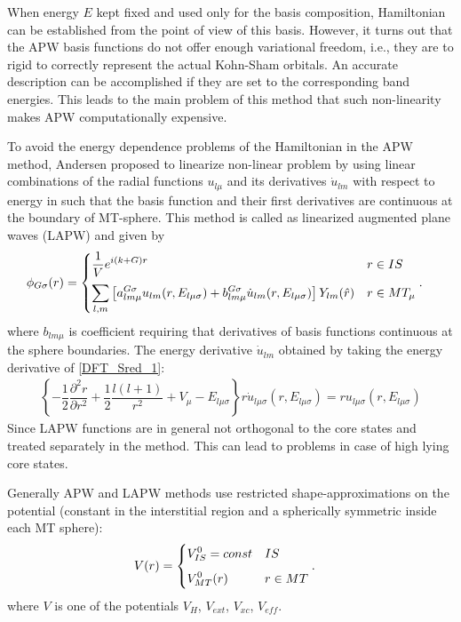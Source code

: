 When energy $E$ kept fixed and used only for the basis composition, Hamiltonian can be established from the point of view of this basis. However, it turns out that the APW basis functions do not offer enough variational freedom, i.e., they are to rigid to correctly represent the actual Kohn-Sham orbitals. An accurate description can be accomplished if they are set to the corresponding band energies. This leads to the main problem of this method that such non-linearity makes APW computationally expensive.

To avoid the energy dependence problems of the Hamiltonian in the APW method, Andersen proposed to linearize non-linear problem by using linear combinations of the radial functions $u_{l \mu}$ and its derivatives $\dot{u}_{l m}$ with respect to energy in such that the basis function and their first derivatives are continuous at the boundary of MT-sphere. This method is called as linearized augmented plane waves (LAPW) \citep{PhysRevB.12.3060} and given by
\begin{align}
\phi_{G \sigma}(r)
 &=
  \begin{cases}
   \vspace{.2cm}
   \displaystyle
   \dfrac{1}{V} e^{i(k+G)r}
   & r \in IS
   \\
   \displaystyle
   \sum_{l,m} \left[ a_{l m \mu}^{G \sigma} u_{l m} (r,E_{l \mu \sigma})+b_{l m \mu}^{G \sigma} \dot{u}_{l m} (r,E_{l \mu \sigma})  \right]  Y_{l m} (\hat{r})
   & r \in MT_{\mu}
  \end{cases}.
\label{LAPW}
\end{align}
where $b_{l m \mu}$ is coefficient requiring that derivatives of basis functions continuous at the sphere boundaries.
The energy derivative $\dot{u}_{l m}$ obtained by taking the energy derivative of \eqref{DFT_Sred_1}:
\begin{align}
\left\lbrace -\dfrac{1}{2} \dfrac{\partial^2 r}{\partial r^2} + \dfrac{1}{2} \dfrac{l(l+1)}{r^2} + V_{\mu} - E_{l \mu \sigma} \right\rbrace r \dot{u}_{l \mu \sigma}(r,E_{l \mu \sigma})= r u_{l \mu \sigma}(r,E_{l \mu \sigma})
\label{DFT_Sred_2}
\end{align}
Since LAPW functions are in general not orthogonal to the core states and treated separately in the method. This can lead to problems in case of high lying core states.

Generally APW and LAPW methods use restricted shape-approximations on the potential (constant in the interstitial region and a spherically symmetric inside each MT sphere):
\begin{align}
V(r)
 &=
  \begin{cases}
   \vspace{.2cm}
   \displaystyle
   V_{IS}^0=const
   & IS
   \\
   \displaystyle
   V_{MT}^0(r)
   & r \in MT
  \end{cases}.
\label{APW_potentials}
\end{align}
where $V$ is one of the potentials $V_{H}$, $V_{ext}$, $V_{xc}$, $V_{eff}$.

